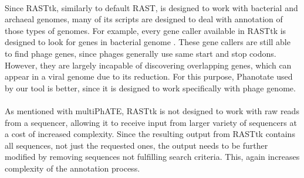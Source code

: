 \paragraph*{}
Since RASTtk, similarly to default RAST, is designed to work with bacterial and archaeal genomes, many of its scripts are designed to deal with annotation of those types of genomes. For example, every gene caller available in RASTtk is designed to look for genes in bacterial genome \cite{brettin2015rasttk}. These gene callers are still able to find phage genes, since phages generally use same start and stop codons. However, they are largely incapable of discovering overlapping genes, which can appear in a viral genome due to its reduction. For this purpose, Phanotate used by our tool is better, since it is designed to work specifically with phage genome.
\paragraph*{}
As mentioned with multiPhATE, RASTtk is not designed to work with raw reads from a sequencer, allowing it to receive input from larger variety of sequencers at a cost of increased complexity. Since the resulting output from RASTtk contains all sequences, not just the requested ones, the output needs to be further modified by removing sequences not fulfilling search criteria. This, again increases complexity of the annotation process.